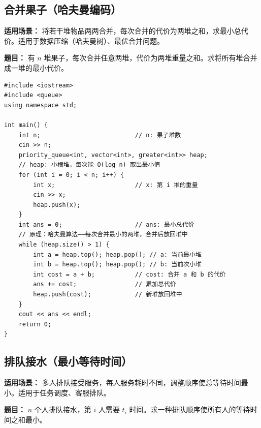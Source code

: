 \documentclass[12pt,a4paper]{ctexart}
\begin{document}
\subsection{合并果子（哈夫曼编码）}
\textbf{适用场景：} 将若干堆物品两两合并，每次合并的代价为两堆之和，求最小总代价。适用于数据压缩（哈夫曼树）、最优合并问题。

\textbf{题目：} 有 $n$ 堆果子，每次合并任意两堆，代价为两堆重量之和。求将所有堆合并成一堆的最小代价。

\begin{lstlisting}[caption={贪心——小根堆每次取最小的两堆合并}]
#include <iostream>
#include <queue>
using namespace std;

int main() {
    int n;                          // n: 果子堆数
    cin >> n;
    priority_queue<int, vector<int>, greater<int>> heap;
    // heap: 小根堆，每次能 O(log n) 取出最小值
    for (int i = 0; i < n; i++) {
        int x;                      // x: 第 i 堆的重量
        cin >> x;
        heap.push(x);
    }
    int ans = 0;                    // ans: 最小总代价
    // 原理：哈夫曼算法——每次合并最小的两堆，合并后放回堆中
    while (heap.size() > 1) {
        int a = heap.top(); heap.pop(); // a: 当前最小堆
        int b = heap.top(); heap.pop(); // b: 当前次小堆
        int cost = a + b;           // cost: 合并 a 和 b 的代价
        ans += cost;                // 累加总代价
        heap.push(cost);            // 新堆放回堆中
    }
    cout << ans << endl;
    return 0;
}
\end{lstlisting}

\subsection{排队接水（最小等待时间）}
\textbf{适用场景：} 多人排队接受服务，每人服务耗时不同，调整顺序使总等待时间最小。适用于任务调度、客服排队。

\textbf{题目：} $n$ 个人排队接水，第 $i$ 人需要 $t_i$ 时间。求一种排队顺序使所有人的等待时间之和最小。
\end{document}
